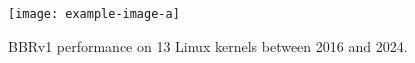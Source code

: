 \begin{figure}[t!]
    \centering
    \texttt{[image: example-image-a]}
    \caption{BBRv1 performance on 13 Linux kernels between 2016 and 2024.}
    \label{fig:bbr1-over-time}
\end{figure}
